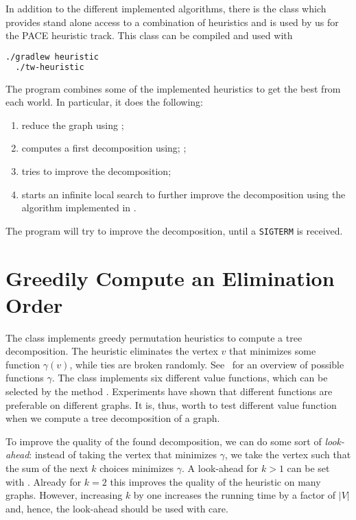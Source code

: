\documentclass[a4paper, ukenglish, twoside, openright]{jdrasilmanual}
\begin{document}
In addition to the different implemented algorithms, there is the
class  which provides stand alone access to a
combination of heuristics and is used by us for the PACE heuristic
track. This class can be compiled and used with
\begin{lstlisting}[language=bash]
  ./gradlew heuristic
  ./tw-heuristic
\end{lstlisting}
The program combines some of the implemented heuristics to get the
best from each world. In particular, it does the following:
\begin{enumerate}
  \item reduce the graph using ;
  \item computes a first decomposition using;
    ;
  \item tries to improve the decomposition;
  \item starts an infinite local search to further improve the
    decomposition using the algorithm implemented in .
\end{enumerate}
The program will try to improve the decomposition, until a
\texttt{SIGTERM} is received. 

\section{Greedily Compute an Elimination Order}
The class  implements greedy
permutation heuristics to compute a tree decomposition. The heuristic
eliminates the vertex $v$ that minimizes some function $\gamma(v)$,
while ties are broken randomly. See~\cite{bodlaender2010treewidth}
for an overview of possible functions $\gamma$. The class implements
six different value functions, which can be selected by the method
. Experiments have shown that different functions are
preferable on different graphs. It is, thus, worth to test different
value function when we compute a tree decomposition of a graph.

To improve the quality of the found decomposition, we can do some sort
of \emph{look-ahead}: instead of taking the vertex that minimizes
$\gamma$, we take the vertex such that the sum of the next $k$ choices
minimizes $\gamma$. A look-ahead for $k>1$ can be set with
. Already for $k=2$ this improves the quality of
the heuristic on many graphs. However, increasing $k$ by one increases
the running time by a factor of $|V|$ and, hence, the look-ahead
should be used with care.
\end{document}
